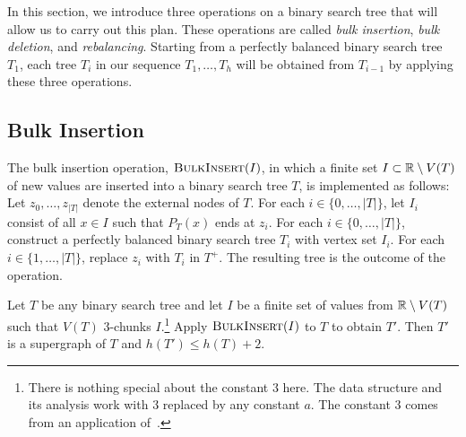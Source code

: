 \documentclass[kpfonts]{patmorin}
\let\le\leqslant
\begin{document}
In this section, we introduce three operations on a binary search tree that will allow us to carry out this plan.
These operations are called \emph{bulk insertion}, \emph{bulk deletion}, and \emph{rebalancing}.
Starting from a perfectly balanced binary search tree $T_1$, each tree $T_i$ in our sequence $T_1, \dots, T_h$ will be obtained from $T_{i-1}$ by applying these three operations.




\subsection{Bulk Insertion}

The bulk insertion operation, $\textsc{BulkInsert}(I)$,
in which a finite set $I\subset  \mathbb{R}\setminus V(T)$ of new values are inserted into a binary search tree $T$, is implemented as follows: Let $z_0,\ldots,z_{|T|}$ denote the external nodes of $T$.  For each $i\in\{0,\ldots,|T|\}$, let $I_i$ consist of all $x\in I$ such that $P_T(x)$ ends at $z_i$.
For each $i\in\{0,\ldots,|T|\}$, construct a perfectly balanced binary search tree $T_i$ with vertex set $I_i$.
For each $i\in\{1,\ldots,|T|\}$, replace $z_i$ with $T_i$ in $T^+$.
The resulting tree is the outcome of the operation.

\begin{lem}
  Let $T$ be any binary search tree and let $I$ be a finite set of values from $\mathbb{R}\setminus V(T)$ such that
  $V(T)$ $3$-chunks $I$.\footnote{There is nothing special about the constant $3$ here.  The data structure and its analysis work with $3$ replaced by any constant $a$. The constant $3$ comes from an application of~.}
  Apply $\textsc{BulkInsert}(I)$ to $T$ to obtain $T'$.
  Then $T'$ is a supergraph of $T$ and $h(T')\le h(T)+2$.
\end{lem}
\end{document}

